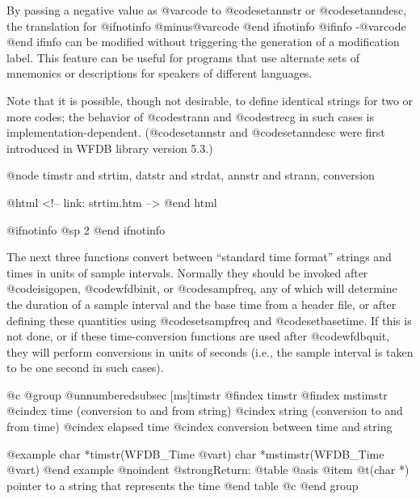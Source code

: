 {{{{{{{{By passing a negative value as @var{code} to @code{setannstr} or
@code{setanndesc}, the translation for
@ifnotinfo
@minus{}@var{code}
@end ifnotinfo
@ifinfo
-@var{code}
@end ifinfo
can be modified without triggering the generation of a modification label.
This feature can be useful for programs that use alternate sets of
mnemonics or descriptions for speakers of different languages.

Note that it is possible, though not desirable, to define identical
strings for two or more codes; the behavior of @code{strann} and
@code{strecg} in such cases is implementation-dependent.
(@code{setannstr} and @code{setanndesc} were first introduced in WFDB
library version 5.3.)

@node     timstr and strtim, datstr and strdat, annstr and strann, conversion

@html
<!-- link: strtim.htm -->
@end html

@ifnotinfo
@sp 2
@end ifnotinfo

The next three functions convert between ``standard time format''
strings and times in units of sample intervals.  Normally they should be
invoked after @code{isigopen}, @code{wfdbinit}, or @code{sampfreq}, any of
which will determine the duration of a sample interval and the base time
from a header file, or after defining these quantities using
@code{setsampfreq} and @code{setbasetime}.  If this is not done, or if
these time-conversion functions are used after @code{wfdbquit}, they will
perform conversions in units of seconds (i.e., the sample interval is
taken to be one second in such cases).

@c @group
@unnumberedsubsec [ms]timstr
@findex timstr
@findex mstimstr
@cindex time (conversion to and from string)
@cindex string (conversion to and from time)
@cindex elapsed time
@cindex conversion between time and string

@example
char *timstr(WFDB_Time @var{t})
char *mstimstr(WFDB_Time @var{t})
@end example
@noindent
@strong{Return:}
@table @asis
@item @t{(char *)}
pointer to a string that represents the time
@end table
@c @end group

}}}}}}}}
